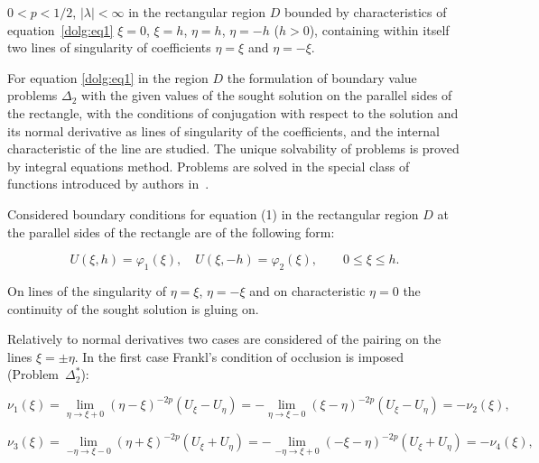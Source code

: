 \noindent

$0<p<{1}/{2}$, $|\lambda|<\infty$ in the rectangular region $D$ bounded by characteristics of equa\-tion~\eqref{dolg:eq1} $\xi=0$, $\xi=h$, $\eta=h$, $\eta=-h$ ($h>0$), containing within itself two lines of singularity of coefficients $\eta=\xi$ and $\eta=-\xi$. 

For equation \eqref{dolg:eq1}  in the region $D$ the formulation of boundary value problems $\Delta_2$ with the given values of the sought solution on the parallel sides of the rectangle, with the conditions of conjugation with respect to the solution and its normal derivative as lines of singularity of the coefficients, and the internal characteristic of the line are studied. The unique solvability of problems is proved by integral equations method. Problems are solved in the special class of functions introduced by authors in~\cite{dolg:9}.









\smallskip




Considered boundary conditions for equation (1) in the rectangular region $D$ at the parallel sides of the rectangle are of the following form:

$$ U(\xi, h) = \varphi_1(\xi), \quad U(\xi, - h) = \varphi_2(\xi), \qquad 0\leq \xi \leq h.$$

On lines of the singularity of $\eta=\xi$, $\eta=-\xi$ and on characteristic $\eta=0$ the continuity of the sought solution is gluing on.











Relatively to normal derivatives two cases are considered of the pairing on the lines $\xi=\pm\eta$. In the first case Frankl's condition of occlusion  is imposed (Problem~$\Delta_2^*$):

$$ \nu_1(\xi) = \lim_{\eta \to \xi+0} (\eta-\xi)^{-2p} (U_\xi - U_\eta) =  - \lim_{\eta \to \xi-0} (\xi-\eta)^{-2p} (U_\xi - U_\eta) = - \nu_2(\xi), $$

$$ \nu_3(\xi) = \lim_{ - \eta \to \xi-0} (\eta+\xi)^{-2p} (U_\xi + U_\eta) =  - \lim_{ - \eta \to \xi+0} (-\xi-\eta)^{-2p} (U_\xi + U_\eta) = - \nu_4(\xi), $$

